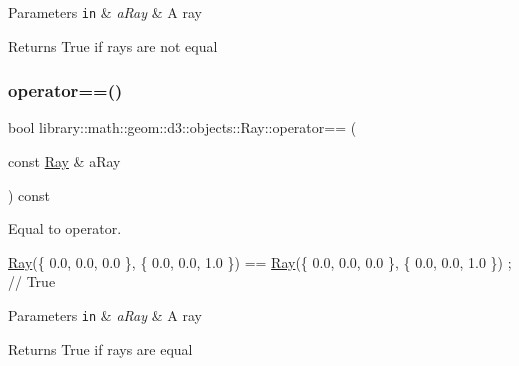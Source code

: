 \begin{DoxyParams}[1]{Parameters}
\mbox{\tt in}  & {\em a\+Ray} & A ray \\
\hline
\end{DoxyParams}
\begin{DoxyReturn}{Returns}
True if rays are not equal 
\end{DoxyReturn}
\mbox{\label{classlibrary_1_1math_1_1geom_1_1d3_1_1objects_1_1_ray_a90dbc4baa23e5f74b26b566bb862592f}} 
\subsubsection{\texorpdfstring{operator==()}{operator==()}}
{\footnotesize\ttfamily bool library\+::math\+::geom\+::d3\+::objects\+::\+Ray\+::operator== (\begin{DoxyParamCaption}\item[{const \hyperlink{classlibrary_1_1math_1_1geom_1_1d3_1_1objects_1_1_ray}{Ray} \&}]{a\+Ray }\end{DoxyParamCaption}) const}



Equal to operator. 


\begin{DoxyCode}
\hyperlink{classlibrary_1_1math_1_1geom_1_1d3_1_1objects_1_1_ray_a11b7613464daaebc6e25a758b057f203}{Ray}(\{ 0.0, 0.0, 0.0 \}, \{ 0.0, 0.0, 1.0 \}) == \hyperlink{classlibrary_1_1math_1_1geom_1_1d3_1_1objects_1_1_ray_a11b7613464daaebc6e25a758b057f203}{Ray}(\{ 0.0, 0.0, 0.0 \}, \{ 0.0, 0.0, 1.0 \}) ; \textcolor{comment}{// True}
\end{DoxyCode}



\begin{DoxyParams}[1]{Parameters}
\mbox{\tt in}  & {\em a\+Ray} & A ray \\
\hline
\end{DoxyParams}
\begin{DoxyReturn}{Returns}
True if rays are equal 
\end{DoxyReturn}
\mbox{\label{classlibrary_1_1math_1_1geom_1_1d3_1_1objects_1_1_ray_a2140183dca4c36f5c51ed9e8f2cd220d}} 
